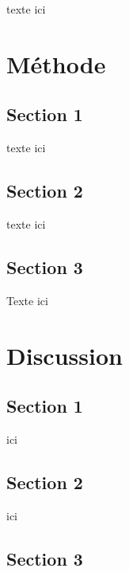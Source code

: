 \documentclass[9pt,twocolumn,twoside,]{pnas-new}
\begin{document}
texte ici

\hypertarget{muxe9thode}{%
\section*{Méthode}\label{muxe9thode}}

\hypertarget{section-1-1}{%
\subsection*{Section 1}\label{section-1-1}}

texte ici

\hypertarget{section-2-1}{%
\subsection*{Section 2}\label{section-2-1}}

texte ici

\hypertarget{section-3-1}{%
\subsection*{Section 3}\label{section-3-1}}

Texte ici

\hypertarget{discussion}{%
\section*{Discussion}\label{discussion}}

\hypertarget{section-1-2}{%
\subsection*{Section 1}\label{section-1-2}}

ici

\hypertarget{section-2-2}{%
\subsection*{Section 2}\label{section-2-2}}

ici

\hypertarget{section-3-2}{%
\subsection*{Section 3}\label{section-3-2}}
\end{document}
